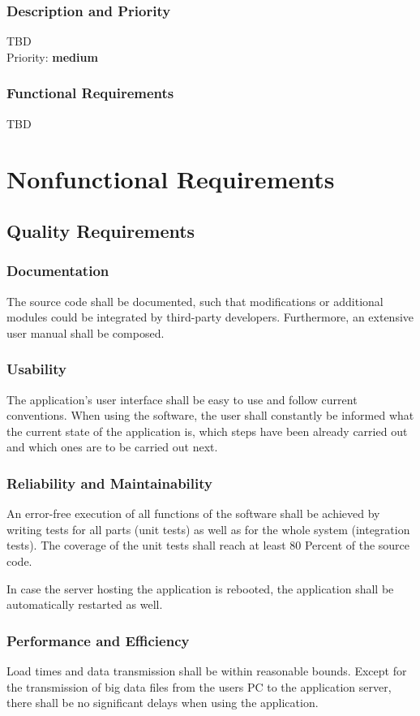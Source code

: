 \documentclass[a4paper]{srs}
\begin{document}
\subsubsection*{Description and Priority}
TBD
\\Priority: {\bfseries medium}
\subsubsection*{Functional Requirements}
TBD

	\section{Nonfunctional Requirements}

\subsection{Quality Requirements}

\subsubsection{Documentation}
The source code shall be documented, such that modifications or additional 
modules could be integrated by third-party developers. Furthermore, an
extensive user manual shall be composed.

\subsubsection{Usability}
The application's user interface shall be easy to use and follow current 
conventions. When using the software, the user shall constantly be informed what 
the current state of the application is, which steps have been already carried 
out and which ones are to be carried out next.

\subsubsection{Reliability and Maintainability}
An error-free execution of all functions of the software shall be achieved by 
writing tests for all parts (unit tests) as well as for the whole system 
(integration tests). The coverage of the unit tests shall reach at least 80 
Percent of the source code.

In case the server hosting the application is rebooted, the application shall be 
automatically restarted as well.

\subsubsection{Performance and Efficiency}
Load times and data transmission shall be within reasonable bounds. Except for 
the transmission of big data files from the users PC to the application server, 
there shall be no significant delays when using the application.
\end{document}
